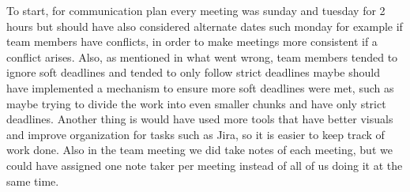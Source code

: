 \documentclass{article}
\begin{document}
To start, for communication plan every meeting was sunday and tuesday for 2 hours but should have also considered alternate dates such monday for example if team members have conflicts, in order to make meetings more consistent if a conflict arises. Also, as mentioned in what went wrong, team members tended to ignore soft deadlines and tended to only follow strict deadlines maybe should have implemented a mechanism to ensure more soft deadlines were met, such as maybe trying to divide the work into even smaller chunks and have only strict deadlines. Another thing is would have used more tools that have better visuals and improve organization for tasks such as Jira, so it is easier to keep track of work done. Also in the team meeting we did take notes of each meeting, but we could have assigned one note taker per meeting instead of all of us doing it at the same time.
\end{document}
